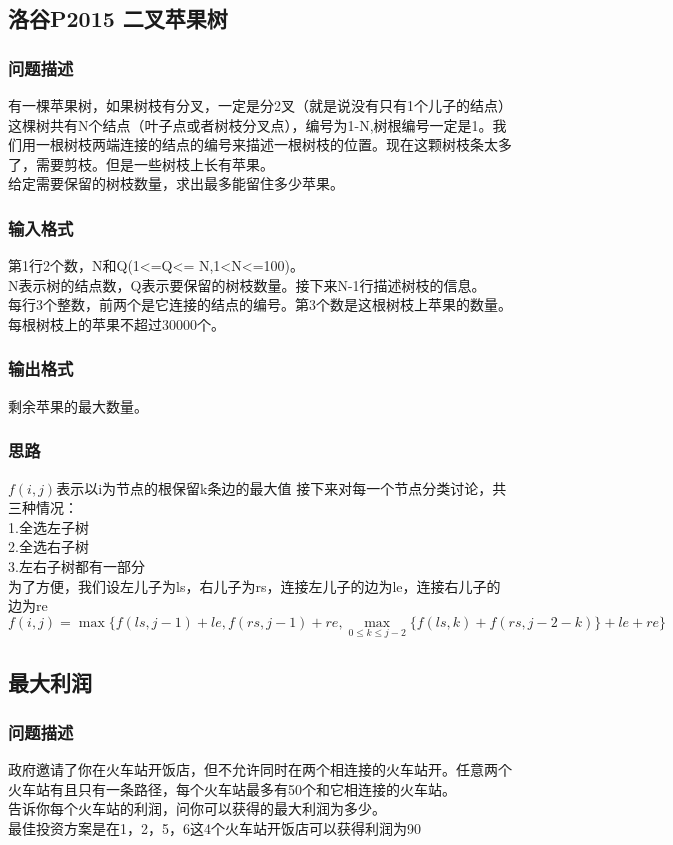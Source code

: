 \subsection{洛谷P2015 二叉苹果树}
    \subsubsection{问题描述}
        有一棵苹果树，如果树枝有分叉，一定是分2叉（就是说没有只有1个儿子的结点）这棵树共有N个结点（叶子点或者树枝分叉点），编号为1-N,树根编号一定是1。我们用一根树枝两端连接的结点的编号来描述一根树枝的位置。现在这颗树枝条太多了，需要剪枝。但是一些树枝上长有苹果。\\
        给定需要保留的树枝数量，求出最多能留住多少苹果。
    \subsubsection{输入格式}
        第1行2个数，N和Q(1<=Q<= N,1<N<=100)。\\
        N表示树的结点数，Q表示要保留的树枝数量。接下来N-1行描述树枝的信息。\\
        每行3个整数，前两个是它连接的结点的编号。第3个数是这根树枝上苹果的数量。\\
        每根树枝上的苹果不超过30000个。
    \subsubsection{输出格式}
        剩余苹果的最大数量。
    \subsubsection{思路}
        $f(i,j)$表示以i为节点的根保留k条边的最大值
        接下来对每一个节点分类讨论，共三种情况：\\
        1.全选左子树\\
        2.全选右子树\\
        3.左右子树都有一部分\\
        为了方便，我们设左儿子为ls，右儿子为rs，连接左儿子的边为le，连接右儿子的边为re\\
        $$f(i,j)=\max{\{f(ls,j-1)+le, f(rs,j-1)+re, \max_{0 \leq k \leq j-2}{\{f(ls,k)+f(rs,j-2-k)\}}+le+re\}}$$

\subsection{最大利润}
    \subsubsection{问题描述}
        政府邀请了你在火车站开饭店，但不允许同时在两个相连接的火车站开。任意两个火车站有且只有一条路径，每个火车站最多有50个和它相连接的火车站。\\
        告诉你每个火车站的利润，问你可以获得的最大利润为多少。\\
        最佳投资方案是在1，2，5，6这4个火车站开饭店可以获得利润为90
